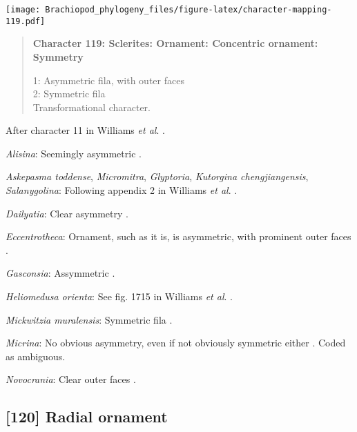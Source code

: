 \documentclass[openany]{book}
\theoremstyle{definition}
\theoremstyle{definition}
\theoremstyle{definition}
\theoremstyle{remark}
\begin{document}
\texttt{[image: Brachiopod\_phylogeny\_files/figure-latex/character-mapping-119.pdf]}

\begin{quote}
\textbf{Character 119: Sclerites: Ornament: Concentric ornament:
Symmetry}

1: Asymmetric fila, with outer faces\\
2: Symmetric fila\\
Transformational character.
\end{quote}

After character 11 in Williams \emph{et al}.
\citeyearpar{Williams1998Thediversity}.

\hypertarget{Alisina-coding-119}{}
\emph{Alisina}: Seemingly asymmetric \citetext{\citealp[fig.
122.3c]{Williams2000LinguliformeaCraniiformea}; \citealp[Fig.
1]{Zhang2011Anobolellate}}.

\hypertarget{Askepasma_toddense-coding-119}{}
\emph{Askepasma toddense}, \emph{Micromitra}, \emph{Glyptoria},
\emph{Kutorgina chengjiangensis}, \emph{Salanygolina}: Following
appendix 2 in Williams \emph{et al}.
\citeyearpar{Williams1998Thediversity}.

\hypertarget{Dailyatia-coding-119}{}
\emph{Dailyatia}: Clear asymmetry \citep{Skovsted2015Theearly}.

\hypertarget{Eccentrotheca-coding-119}{}
\emph{Eccentrotheca}: Ornament, such as it is, is asymmetric, with
prominent outer faces \citep{Skovsted2011Scleritomeconstruction}.

\hypertarget{Gasconsia-coding-119}{}
\emph{Gasconsia}: Assymmetric \citep[fig. 3]{Hanken1985Thetaxonomy}.

\hypertarget{Heliomedusa_orienta-coding-119}{}
\emph{Heliomedusa orienta}: See fig. 1715 in Williams \emph{et al}.
\citeyearpar{Williams2007Supplement}.

\hypertarget{Mickwitzia_muralensis-coding-119}{}
\emph{Mickwitzia muralensis}: Symmetric fila
\citep{Balthasar2004Shellstructure}.

\hypertarget{Micrina-coding-119}{}
\emph{Micrina}: No obvious asymmetry, even if not obviously symmetric
either \citep{Holmer2008TheEarly}. Coded as ambiguous.

\hypertarget{Novocrania-coding-119}{}
\emph{Novocrania}: Clear outer faces \citep[fig.
100.2b]{Williams2000LinguliformeaCraniiformea}.

\subsection*{{[}120{]} Radial ornament}\label{radial-ornament}
\end{document}

